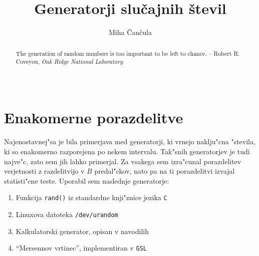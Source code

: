 \documentclass[a4paper,10pt]{article}
\title{Generatorji slu\v cajnih \v stevil}
\author{Miha \v Can\v cula}
\begin{document}
 \maketitle

\begin{abstract}
 The generation of random numbers is too important to be left to chance.
     -- Robert R. Coveyou, \textit{Oak Ridge National Laboratory}
\.\\
\begin{figure}[h!]
\centering
  \\
\end{figure}
\end{abstract}

\section{Enakomerne porazdelitve}

Najenostavnej"sa je bila primerjava med generatorji, ki vrnejo naklju"cna "stevila, ki so enakomerno razporejena po nekem intervalu. Tak"snih generatorjev je tudi najve"c, zato sem jih lahko primerjal. Za vsakega sem izra"cunal porazdelitev verjetnosti z razdelitvijo v $B$ predal"ckov, nato pa na ti porazdelitvi izvajal statisti"cne teste. Uporabil sem naslednje generatorje:

\begin{enumerate}
 \item Funkcija \texttt{rand()} iz standardne knji"znice jezika \texttt{C}
 \item Linuxova datoteka \texttt{/dev/urandom}
 \item Kalkulatorski generator, opisan v navodilih
 \item ``Mersennov vrtinec'', implementiran v \texttt{GSL} 
\end{enumerate}
\end{document}
